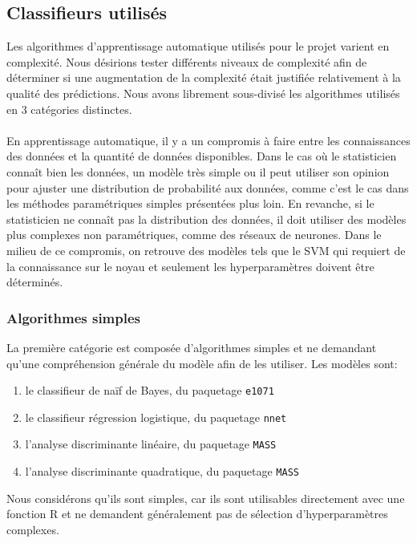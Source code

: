 \subsection{Classifieurs utilisés}
Les algorithmes d'apprentissage automatique utilisés pour le projet varient en complexité. Nous désirions tester différents niveaux de complexité afin de déterminer si une augmentation de la complexité était justifiée relativement à la qualité des prédictions. Nous avons librement sous-divisé les algorithmes utilisés en 3 catégories distinctes. \\ \\
En apprentissage automatique, il y a un compromis à faire entre les connaissances des données et la quantité de données disponibles. Dans le cas où le statisticien connaît bien les données, un modèle très simple ou il peut utiliser son opinion pour ajuster une distribution de probabilité aux données, comme c'est le cas dans les méthodes paramétriques simples présentées plus loin. En revanche, si le statisticien ne connaît pas la distribution des données, il doit utiliser des modèles plus complexes non paramétriques, comme des réseaux de neurones. Dans le milieu de ce compromis, on retrouve des modèles tels que le SVM qui requiert de la connaissance sur le noyau et seulement les hyperparamètres doivent être déterminés.

\subsubsection{Algorithmes simples}
La première catégorie est composée d'algorithmes simples et ne demandant qu'une compréhension générale du modèle afin de les utiliser. Les modèles sont:

\begin{enumerate}
  \item le classifieur de naïf de Bayes, du paquetage \texttt{e1071} \cite{packagee1071}
  \item le classifieur régression logistique, du paquetage \texttt{nnet} \cite{packagennet} 
  \item l'analyse discriminante linéaire, du paquetage \texttt{MASS} \cite{packageMASS}
  \item l'analyse discriminante quadratique, du paquetage \texttt{MASS}  \cite{packageMASS}
\end{enumerate}

Nous considérons qu'ils sont simples, car ils sont utilisables directement avec une fonction R et ne demandent généralement pas de sélection d'hyperparamètres complexes.

